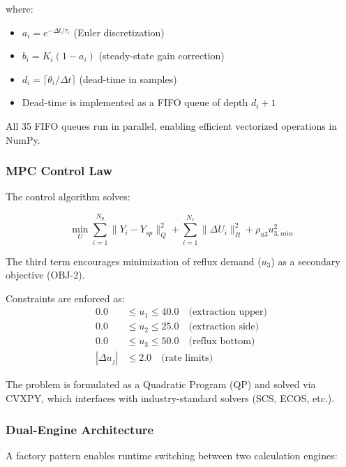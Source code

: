 \documentclass[conference]{IEEEtran}
\begin{document}
where:
\begin{itemize}
\item $a_i = e^{-\Delta t / \tau_i}$ (Euler discretization)
\item $b_i = K_i(1 - a_i)$ (steady-state gain correction)
\item $d_i = \lceil \theta_i / \Delta t \rceil$ (dead-time in samples)
\item Dead-time is implemented as a FIFO queue of depth $d_i + 1$
\end{itemize}

All 35 FIFO queues run in parallel, enabling efficient vectorized operations in NumPy.

\subsubsection{MPC Control Law}

The control algorithm solves:

\begin{equation}
\min_{U} \sum_{i=1}^{N_p} \|Y_i - Y_{sp}\|_Q^2 + \sum_{i=1}^{N_c} \|\Delta U_i\|_R^2 + \rho_{u3} u_{3,min}^2
\label{eq:mpc_qp}
\end{equation}

The third term encourages minimization of reflux demand ($u_3$) as a secondary objective (OBJ-2).

Constraints are enforced as:
\begin{align}
0.0 &\le u_1 \le 40.0 \quad \text{(extraction upper)} \\
0.0 &\le u_2 \le 25.0 \quad \text{(extraction side)} \\
0.0 &\le u_3 \le 50.0 \quad \text{(reflux bottom)} \\
|\Delta u_j| &\le 2.0 \quad \text{(rate limits)}
\end{align}

The problem is formulated as a Quadratic Program (QP) and solved via CVXPY, which interfaces with industry-standard solvers (SCS, ECOS, etc.).

\subsubsection{Dual-Engine Architecture}

A factory pattern enables runtime switching between two calculation engines:
\end{document}
